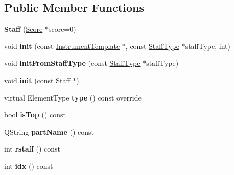 \subsection*{Public Member Functions}
\begin{DoxyCompactItemize}
\item 
\mbox{\label{class_ms_1_1_staff_ad926ce4018d4a7bfd4ac873be74656bc}} 
{\bfseries Staff} (\hyperlink{class_ms_1_1_score}{Score} $\ast$score=0)
\item 
\mbox{\label{class_ms_1_1_staff_ac2fa805de6f61096aa4ade6d04348e6d}} 
void {\bfseries init} (const \hyperlink{class_ms_1_1_instrument_template}{Instrument\+Template} $\ast$, const \hyperlink{class_ms_1_1_staff_type}{Staff\+Type} $\ast$staff\+Type, int)
\item 
\mbox{\label{class_ms_1_1_staff_a8e1d0684f78f3e2c34fbc55272c333ff}} 
void {\bfseries init\+From\+Staff\+Type} (const \hyperlink{class_ms_1_1_staff_type}{Staff\+Type} $\ast$staff\+Type)
\item 
\mbox{\label{class_ms_1_1_staff_a1ae3668199a9ddd7fc1c65c1b75b2ca3}} 
void {\bfseries init} (const \hyperlink{class_ms_1_1_staff}{Staff} $\ast$)
\item 
\mbox{\label{class_ms_1_1_staff_a529f768be72d30bcd70cf6f05e01e54f}} 
virtual Element\+Type {\bfseries type} () const override
\item 
\mbox{\label{class_ms_1_1_staff_a844c77bb4dd38e718c5d9a4cf2464d5d}} 
bool {\bfseries is\+Top} () const
\item 
\mbox{\label{class_ms_1_1_staff_ae77b0bb03a07af61a932c49533456f22}} 
Q\+String {\bfseries part\+Name} () const
\item 
\mbox{\label{class_ms_1_1_staff_a19693586b624485ae120b2d644ddbf22}} 
int {\bfseries rstaff} () const
\item 
\mbox{\label{class_ms_1_1_staff_aca2b092f2ded9fb7fb4e69c0ac4a054b}} 
int {\bfseries idx} () const
\item 
\mbox{\label{class_ms_1_1_staff_a0a2c8ab7081cb603f6db6ee2d8febf83}} 

\end{DoxyCompactItemize}
